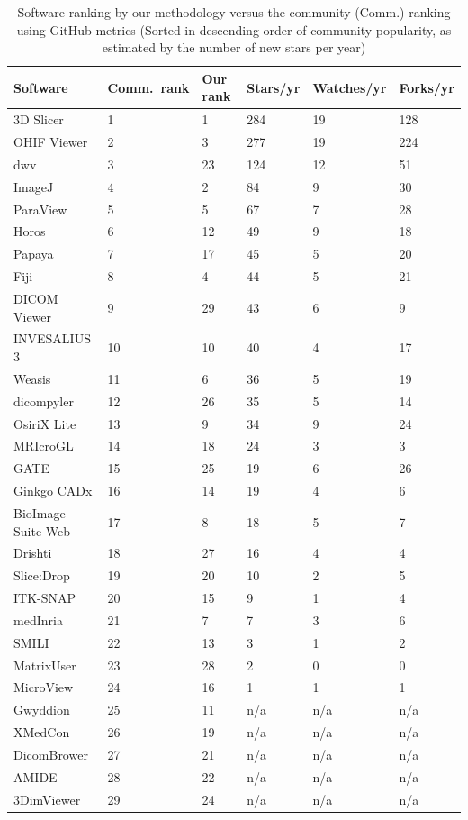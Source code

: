\documentclass[final, 3p, times, authoryear]{elsarticle}
\begin{document}
\begingroup
\renewcommand{\arraystretch}{0.85}
\begin{table}[!ht]
\centering
\begin{tabular}{llllll}
\toprule
Software & Comm.\ rank & Our rank & Stars/yr & Watches/yr & Forks/yr \\ 
\midrule
3D Slicer & 1 & 1 & 284 & 19 & 128 \\
OHIF Viewer & 2 & 3 & 277 & 19 & 224 \\
dwv & 3 & 23 & 124 & 12 & 51 \\
ImageJ & 4 & 2 & 84 & 9 & 30 \\
ParaView & 5 & 5 & 67 & 7 & 28 \\
Horos & 6 & 12 & 49 & 9 & 18 \\
Papaya & 7 & 17 & 45 & 5 & 20 \\
Fiji & 8 & 4 & 44 & 5 & 21 \\
DICOM Viewer & 9 & 29 & 43 & 6 & 9 \\
INVESALIUS 3 & 10 & 10 & 40 & 4 & 17 \\
Weasis & 11 & 6 & 36 & 5 & 19 \\
dicompyler & 12 & 26 & 35 & 5 & 14 \\
OsiriX Lite & 13 & 9 & 34 & 9 & 24 \\
MRIcroGL & 14 & 18 & 24 & 3 & 3 \\
GATE & 15 & 25 & 19 & 6 & 26 \\
Ginkgo CADx & 16 & 14 & 19 & 4 & 6 \\
BioImage Suite Web & 17 & 8 & 18 & 5 & 7 \\
Drishti & 18 & 27 & 16 & 4 & 4 \\
Slice:Drop & 19 & 20 & 10 & 2 & 5 \\
ITK-SNAP & 20 & 15 & 9 & 1 & 4 \\
medInria & 21 & 7 & 7 & 3 & 6 \\
SMILI & 22 & 13 & 3 & 1 & 2 \\
MatrixUser & 23 & 28 & 2 & 0 & 0 \\
MicroView & 24 & 16 & 1 & 1 & 1 \\
Gwyddion & 25 & 11 & n/a & n/a & n/a \\
XMedCon & 26 & 19 & n/a & n/a & n/a \\
DicomBrower & 27 & 21 & n/a & n/a & n/a \\
AMIDE & 28 & 22 & n/a & n/a & n/a \\
3DimViewer & 29 & 24 & n/a & n/a & n/a \\ 
\bottomrule
\end{tabular}
\caption{Software ranking by our methodology versus the community (Comm.)
ranking using GitHub metrics (Sorted in descending order of community
popularity, as estimated by the number of new stars per year)}
\label{tab_ranking_vs_GitHub}
\end{table}
\endgroup
\end{document}
